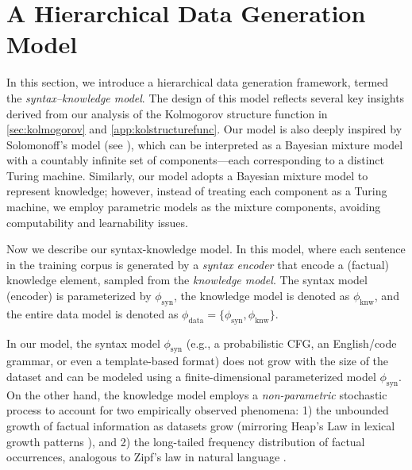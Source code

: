 \documentclass[11pt]{article}
\theoremstyle{plain}
\theoremstyle{definition}
\newcommand{\dataModel}{\phi_{\text{data}}}
\newcommand{\knwModel}{\phi_{\text{knw}}}
\newcommand{\synModel}{\phi_{\text{syn}}}
\begin{document}






\vspace{-0.3cm}
\section{A Hierarchical Data Generation Model}
\label{sec:datageneration}
\vspace{-0.2cm}

In this section, we introduce a hierarchical data generation framework, termed the {\em syntax–knowledge model}. The design of this model reflects several key insights derived from our analysis of the Kolmogorov structure function in \cref{sec:kolmogorov} and \cref{app:kolstructurefunc}. 
Our model is also deeply inspired by Solomonoff’s model (see \cite{Solomonoff1964a,cover2006elements}), 
which can be interpreted as a Bayesian mixture model with a countably infinite set of components—each corresponding to a distinct Turing machine. Similarly, our model adopts a Bayesian mixture model to represent knowledge; however, instead of treating each component as a Turing machine, we employ parametric models as the mixture components, avoiding computability and learnability issues.

Now we describe our syntax-knowledge model.
In this model, where each sentence in the training corpus is generated by a {\em syntax encoder} that encode a (factual) knowledge element, sampled from the {\em  knowledge model}. 
The syntax model (encoder) is parameterized by $\synModel$, the knowledge model is denoted as $\knwModel$, and the entire data model is denoted as 
$\dataModel=\{\synModel,\knwModel\}$. 

In our model, the syntax model $\synModel$
(e.g., a probabilistic CFG, an English/code grammar, or even a template-based format) does not grow with the size of the dataset and can be modeled using a finite-dimensional parameterized model $\synModel$. On the other hand, the knowledge model employs a {\em non-parametric} stochastic process to account for two empirically observed phenomena: 1) the unbounded growth of factual information as datasets grow (mirroring Heap's Law in lexical growth patterns \citep{heaps1978information}), and 2) the long-tailed frequency distribution of factual occurrences, analogous to Zipf's law in natural language \citep{zipf2013psycho,zipf2016human}. 
\end{document}
